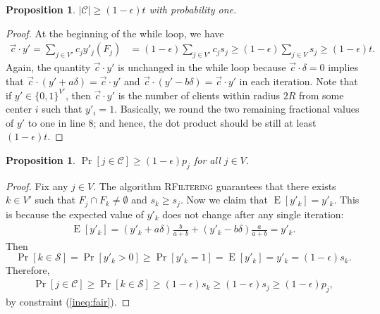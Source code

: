 \documentclass[a4paper,11pt]{article}
\newtheorem{proposition}[theorem]{Proposition}
\DeclareMathOperator*{\E}{\mathrm{E}}
\newcommand{\C}{\mathcal{C}}
\renewcommand{\S}{\mathcal{S}}
\begin{document}
\begin{proposition} $|\C| \geq (1-\epsilon)t$ with probability one.
\end{proposition}
\begin{proof}
At the beginning of the while loop, we have
\begin{align*}
	\vec{c} \cdot y' = \sum_{j \in V'} c_j y'_j(F_j) &= (1-\epsilon) \sum_{j \in V'} c_j s_j \geq (1-\epsilon) \sum_{j \in V}  s_j \geq (1-\epsilon)t.
\end{align*}
Again, the quantity $\vec{c} \cdot y'$ is unchanged in the while loop because $\vec{c} \cdot \delta = 0$ implies that $\vec{c} \cdot (y'+a\delta) = \vec{c} \cdot y'$ and $\vec{c} \cdot (y'-b\delta) = \vec{c} \cdot y'$ in each iteration. Note that if $y' \in \{0,1\}^{V'}$, then $\vec{c} \cdot y'$ is the number of clients within radius $2R$ from some center $i$ such that $y'_i = 1$. Basically, we round the two remaining fractional values of $y'$ to one in line $8$; and hence, the dot product should be still at least $(1-\epsilon)t$.
\end{proof}

\begin{proposition} $\Pr[j \in \C] \geq (1-\epsilon)p_j$ for all $j \in V$.
\end{proposition}
\begin{proof}
Fix any $j \in V$. The algorithm \textsc{RFiltering} guarantees that there exists $k \in V'$ such that $F_j \cap F_k \neq \emptyset$ and $s_k \geq s_j$. Now we claim that $\E[y'_k] = y'_k$. This is because the expected value of $y'_k$ does not change after any single iteration: 
\begin{align*}
	\E[y'_k] = (y'_k+a\delta)\frac{b}{a+b} + (y'_k-b\delta)\frac{a}{a+b} = y'_k.
\end{align*}
Then
$$\Pr[k \in \S] = \Pr[y'_k > 0] \geq \Pr[y'_k = 1] = \E[y'_k] = y'_k = (1-\epsilon)s_k.$$ 
Therefore,
\begin{align*}
	\Pr[j \in \C] \geq \Pr[k \in \S] \geq (1-\epsilon)s_k \geq (1-\epsilon)s_j \geq (1-\epsilon)p_j,
\end{align*}
by constraint (\ref{ineq:fair}).

\end{proof}
\end{document}
